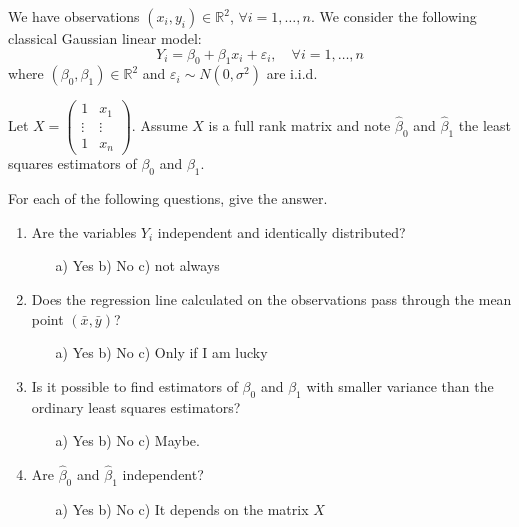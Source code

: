 \begin{exercise}[MCQ]
We have observations \((x_i, y_i) \in \mathbb{R}^2\), \(\forall i = 1, \ldots, n\). We consider the following classical Gaussian linear model:
\[Y_i = \beta_0 + \beta_1 x_i + \varepsilon_i, \quad \forall i = 1, \ldots, n\]
where \((\beta_0, \beta_1) \in \mathbb{R}^2\) and \(\varepsilon_i \sim N(0, \sigma^2)\) are i.i.d.

Let \(X = \begin{pmatrix}
1 & x_1 \\
\vdots & \vdots \\
1 & x_n
\end{pmatrix}\). Assume \(X\) is a full rank matrix and note \(\hat{\beta}_0\) and \(\hat{\beta}_1\) the least squares estimators of \(\beta_0\) and \(\beta_1\).

For each of the following questions, give the answer.

\begin{enumerate}
    \item Are the variables \(Y_i\) independent and identically distributed?
    \begin{itemize}
        \item[a)] Yes \quad b) No \quad c) not always
    \end{itemize}

    \item Does the regression line calculated on the observations pass through the mean point \((\bar{x}, \bar{y})\)?
    \begin{itemize}
        \item[a)] Yes \quad b) No \quad c) Only if I am lucky
    \end{itemize}

    \item Is it possible to find estimators of \(\beta_0\) and \(\beta_1\) with smaller variance than the ordinary least squares estimators?
    \begin{itemize}
        \item[a)] Yes \quad b) No \quad c) Maybe.
    \end{itemize}

    \item Are \(\hat{\beta}_0\) and \(\hat{\beta}_1\) independent?
    \begin{itemize}
        \item[a)] Yes \quad b) No \quad c) It depends on the matrix \(X\)
    \end{itemize}


\end{enumerate}
\end{exercise}

